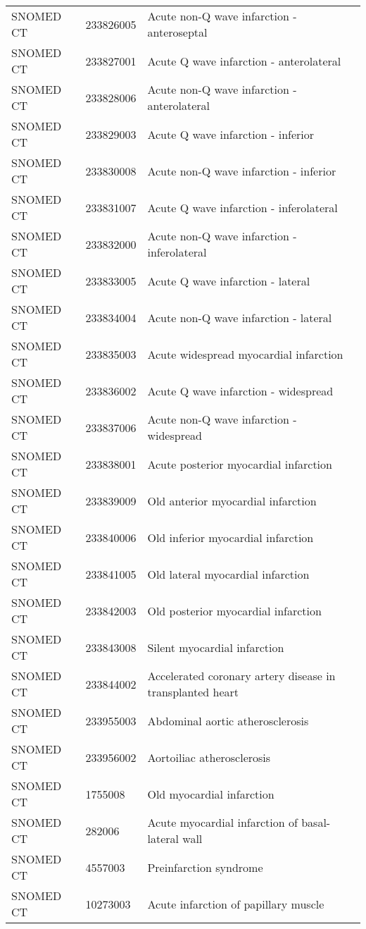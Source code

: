 \begin{longtable}{p{}p{}p{}}
  SNOMED CT & 233826005 & Acute non-Q wave infarction - anteroseptal \\ 
  SNOMED CT & 233827001 & Acute Q wave infarction - anterolateral \\ 
  SNOMED CT & 233828006 & Acute non-Q wave infarction - anterolateral \\ 
  SNOMED CT & 233829003 & Acute Q wave infarction - inferior \\ 
  SNOMED CT & 233830008 & Acute non-Q wave infarction - inferior \\ 
  SNOMED CT & 233831007 & Acute Q wave infarction - inferolateral \\ 
  SNOMED CT & 233832000 & Acute non-Q wave infarction - inferolateral \\ 
  SNOMED CT & 233833005 & Acute Q wave infarction - lateral \\ 
  SNOMED CT & 233834004 & Acute non-Q wave infarction - lateral \\ 
  SNOMED CT & 233835003 & Acute widespread myocardial infarction \\ 
  SNOMED CT & 233836002 & Acute Q wave infarction - widespread \\ 
  SNOMED CT & 233837006 & Acute non-Q wave infarction - widespread \\ 
  SNOMED CT & 233838001 & Acute posterior myocardial infarction \\ 
  SNOMED CT & 233839009 & Old anterior myocardial infarction \\ 
  SNOMED CT & 233840006 & Old inferior myocardial infarction \\ 
  SNOMED CT & 233841005 & Old lateral myocardial infarction \\ 
  SNOMED CT & 233842003 & Old posterior myocardial infarction \\ 
  SNOMED CT & 233843008 & Silent myocardial infarction \\ 
  SNOMED CT & 233844002 & Accelerated coronary artery disease in transplanted heart \\ 
  SNOMED CT & 233955003 & Abdominal aortic atherosclerosis \\ 
  SNOMED CT & 233956002 & Aortoiliac atherosclerosis \\ 
  SNOMED CT & 1755008 & Old myocardial infarction \\ 
  SNOMED CT & 282006 & Acute myocardial infarction of basal-lateral wall \\ 
  SNOMED CT & 4557003 & Preinfarction syndrome \\ 
  SNOMED CT & 10273003 & Acute infarction of papillary muscle \\ 

\end{longtable}

